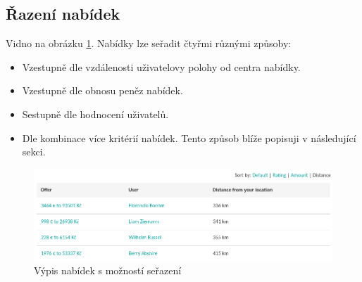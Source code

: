 \subsection{Řazení nabídek}
Vidno na obrázku \ref{fig:tur:sorting}. Nabídky lze seřadit čtyřmi různými způsoby:
\begin{itemize}
	\item Vzestupně dle vzdálenosti uživatelovy polohy od centra nabídky.
	\item Vzestupně dle obnosu peněz nabídek.
	\item Sestupně dle hodnocení uživatelů.
	\item Dle kombinace více kritérií nabídek. Tento způsob blíže popisuji v následující sekci.
\end{itemize}

\begin{figure}[h]
    \centering
    \includegraphics[width=1.0\textwidth]{media/tur/sorting.png}
    \caption{Výpis nabídek s možností seřazení}
    \label{fig:tur:sorting}
\end{figure}


